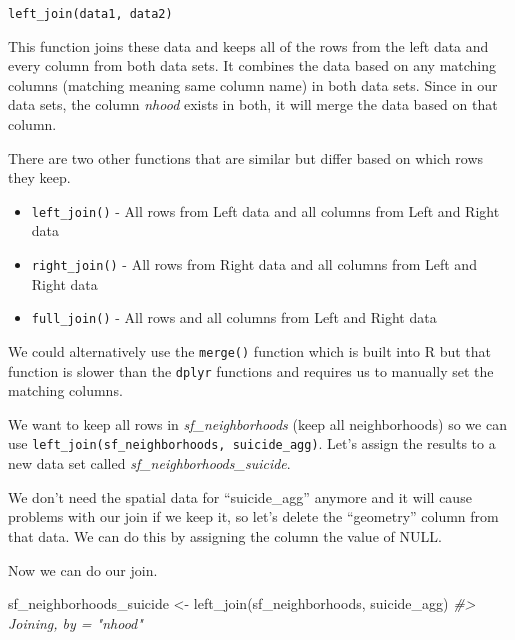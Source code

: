 \documentclass[
]{krantz}
\makeatletter
\newenvironment{Shaded}{\begin{snugshade}}{\end{snugshade}}
\newcommand{\CommentTok}[1]{\textcolor[rgb]{0.37,0.37,0.37}{\textit{#1}}}
\newcommand{\ConstantTok}[1]{\textcolor[rgb]{0,0,0}{#1}}
\newcommand{\FunctionTok}[1]{\textcolor[rgb]{0,0,0}{#1}}
\newcommand{\NormalTok}[1]{#1}
\newcommand{\OtherTok}[1]{\textcolor[rgb]{0.37,0.37,0.37}{#1}}
\newcommand{\SpecialCharTok}[1]{\textcolor[rgb]{0,0,0}{#1}}
\providecommand{\tightlist}{%
  \setlength{\itemsep}{0pt}\setlength{\parskip}{0pt}}
\newenvironment{kframe}{%
\medskip{}
\setlength{\fboxsep}{.8em}
 \def\at@end@of@kframe{}%
 \ifinner\ifhmode%
  \def\at@end@of@kframe{\end{minipage}}%
  \begin{minipage}{\columnwidth}%
 \fi\fi%
 \def\FrameCommand##1{\hskip\@totalleftmargin \hskip-\fboxsep
 \colorbox{shadecolor}{##1}\hskip-\fboxsep
     \hskip-\linewidth \hskip-\@totalleftmargin \hskip\columnwidth}%
 \MakeFramed {\advance\hsize-\width
   \@totalleftmargin\z@ \linewidth\hsize
   \@setminipage}}%
 {\par\unskip\endMakeFramed%
 \at@end@of@kframe}
\renewenvironment{Shaded}{\begin{kframe}}{\end{kframe}}
\makeatother
\begin{document}
\texttt{left\_join(data1,\ data2)}

This function joins these data and keeps all of the rows
from the left data and every column from both data sets. It
combines the data based on any matching columns (matching
meaning same column name) in both data sets. Since in our
data sets, the column \emph{nhood} exists in both, it will
merge the data based on that column.

There are two other functions that are similar but differ
based on which rows they keep.

\begin{itemize}
\tightlist
\item
  \texttt{left\_join()} - All rows from Left data and all
  columns from Left and Right data
\item
  \texttt{right\_join()} - All rows from Right data and all
  columns from Left and Right data
\item
  \texttt{full\_join()} - All rows and all columns from Left
  and Right data
\end{itemize}

We could alternatively use the \texttt{merge()} function
which is built into R but that function is slower than the
\texttt{dplyr} functions and requires us to manually set the
matching columns.

We want to keep all rows in \emph{sf\_neighborhoods} (keep
all neighborhoods) so we can use
\texttt{left\_join(sf\_neighborhoods,\ suicide\_agg)}. Let's
assign the results to a new data set called
\emph{sf\_neighborhoods\_suicide}.

We don't need the spatial data for ``suicide\_agg'' anymore
and it will cause problems with our join if we keep it, so
let's delete the ``geometry'' column from that data. We can
do this by assigning the column the value of NULL.

\begin{Shaded}
\end{Shaded}

Now we can do our join.

\begin{Shaded}
\begin{Highlighting}[]
\NormalTok{sf\_neighborhoods\_suicide }\OtherTok{\textless{}{-}} \FunctionTok{left\_join}\NormalTok{(sf\_neighborhoods, suicide\_agg)}
\CommentTok{\#\textgreater{} Joining, by = "nhood"}
\end{Highlighting}
\end{Shaded}
\end{document}
